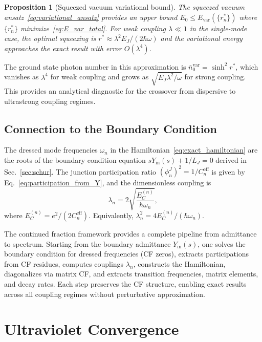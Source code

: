 \documentclass[reprint, floatfix, superscriptaddress, amsmath, amssymb, longbibliography]{revtex4-2}
\newtheorem{proposition}[theorem]{Proposition}
\newcommand{\Yin}{Y_{\mathrm{in}}}
\begin{document}
\begin{proposition}[Squeezed vacuum variational bound]
\label{prop:variational_squeezed}
The squeezed vacuum ansatz~\eqref{eq:variational_ansatz} provides an upper bound $E_0 \leq E_{\mathrm{var}}(\{r_n^*\})$ where $\{r_n^*\}$ minimize~\eqref{eq:E_var_total}. For weak coupling $\lambda \ll 1$ in the single-mode case, the optimal squeezing is $r^* \approx \lambda^2 E_J/(2\hbar\omega)$ and the variational energy approaches the exact result with error $O(\lambda^4)$.
\end{proposition}
The ground state photon number in this approximation is $\bar{n}_0^{\mathrm{var}} = \sinh^2 r^*$, which vanishes as $\lambda^4$ for weak coupling and grows as $\sqrt{E_J\lambda^2/\omega}$ for strong coupling. This provides an analytical diagnostic for the crossover from dispersive to ultrastrong coupling regimes.

\subsection{Connection to the Boundary Condition}
\label{sec:bc_connection}

The dressed mode frequencies $\omega_n$ in the Hamiltonian~\eqref{eq:exact_hamiltonian} are the roots of the boundary condition equation $s\Yin(s) + 1/L_J = 0$ derived in Sec.~\ref{sec:schur}. The junction participation ratio $(\phi_n^J)^2 = 1/C_n^{\mathrm{eff}}$ is given by Eq.~\eqref{eq:participation_from_Y}, and the dimensionless coupling is
\begin{equation}
\lambda_n = 2\sqrt{\frac{E_C^{(n)}}{\hbar\omega_n}},
\label{eq:lambda_from_EC}
\end{equation}
where $E_C^{(n)} = e^2/(2C_n^{\mathrm{eff}})$. Equivalently, $\lambda_n^2 = 4E_C^{(n)}/(\hbar\omega_n)$.

The continued fraction framework provides a complete pipeline from admittance to spectrum. Starting from the boundary admittance $\Yin(s)$, one solves the boundary condition for dressed frequencies (CF zeros), extracts participations from CF residues, computes couplings $\lambda_n$, constructs the Hamiltonian, diagonalizes via matrix CF, and extracts transition frequencies, matrix elements, and decay rates. Each step preserves the CF structure, enabling exact results across all coupling regimes without perturbative approximation.


\section{Ultraviolet Convergence}
\label{sec:uv}
\end{document}
